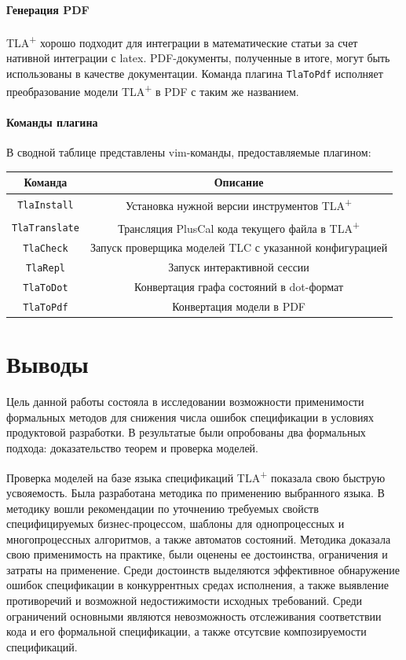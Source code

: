 \documentclass[14pt, openany]{report}
\newcommand{\tlapl}{TLA\textsuperscript{+} }
\newcommand{\prog}[1]{\lstinline[style=progStyle]{#1}}
\begin{document}
\subsubsection{Генерация PDF}
\tlapl хорошо подходит для интеграции в математические статьи за счет нативной интеграции с latex. PDF-документы, полученные в итоге, могут быть использованы в качестве документации. Команда плагина \prog{TlaToPdf} исполняет преобразование модели \tlapl в PDF с таким же названием.

\subsubsection{Команды плагина}
В сводной таблице представлены vim-команды, предоставляемые плагином:

\begin{center}
\begin{tabular}{||c |  c||} 
 \hline
 Команда & Описание\\ 
 \hline\hline
 \prog{TlaInstall} & Установка нужной  версии инструментов \tlapl \\
 \hline
 \prog{TlaTranslate} & Трансляция PlusCal кода текущего файла в \tlapl\\
 \hline
 \prog{TlaCheck} & Запуск проверщика моделей TLC с указанной конфигурацией \\
 \hline
 \prog{TlaRepl} & Запуск интерактивной сессии \\
 \hline
 \prog{TlaToDot} & Конвертация графа состояний в dot-формат\\
 \hline
 \prog{TlaToPdf} & Конвертация модели в PDF\\
 \hline
\end{tabular}
\end{center}


\chapter{Выводы}
Цель данной работы состояла в исследовании возможности применимости формальных методов для снижения числа ошибок спецификации в условиях продуктовой разработки. В результатые были опробованы два формальных подхода: доказательство теорем и проверка моделей. 

Проверка моделей на базе языка спецификаций \tlapl показала свою быструю усвояемость. Была разработана методика по применению выбранного языка. В методику вошли рекомендации по уточнению требуемых свойств специфицируемых бизнес-процессом, шаблоны для однопроцессных и многопроцессных алгоритмов, а также автоматов состояний. Методика доказала свою применимость на практике, были оценены ее достоинства, ограничения и затраты на применение. Среди достоинств выделяются эффективное обнаружение ошибок спецификации в конкуррентных средах исполнения, а также выявление противоречий и возможной недостижимости исходных требований. Среди ограничений основными являются невозможность отслеживания соответствии кода и его формальной спецификации, а также отсутсвие композируемости спецификаций.
\end{document}
